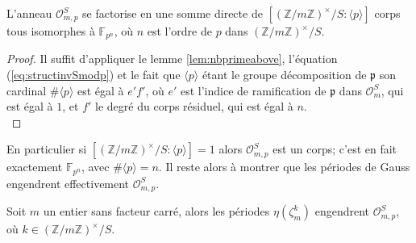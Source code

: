 \documentclass[a4paper]{article} %
\numberwithin{section}{part}
\numberwithin{equation}{section}
\newcommand\zmodninv[1]{(\mathbb{Z}/#1\mathbb{Z})^{\times}}
\newcommand\GF[1]{\mathbb{F}_{#1}}
\newcommand\EO{\mathcal{O}}
\newcommand\groupgen[1]{\langle{#1}\rangle}
\begin{document}
\begin{cor}
L'anneau $\EO_{m,p}^S$ se factorise en une somme directe de
$[\zmodninv{m}/S:\groupgen{p}]$ corps tous isomorphes à $\GF{p^n}$, où $n$ est 
l'ordre de $p$ dans $\zmodninv{m}/S$.
\end{cor}
\begin{proof}
Il suffit d'appliquer le lemme \ref{lem:nbprimeabove}, l'équation
(\ref{eq:structinvSmodp}) et le fait que $\groupgen{p}$ étant le groupe
décomposition de $\mathfrak{p}$ son cardinal $\#\groupgen{p}$ est égal à $e'f'$,
où $e'$ est l'indice de ramification de $\mathfrak{p}$ dans $\EO_m^S$, qui est 
égal à $1$, et $f'$ le degré du corps résiduel, qui est égal à $n$.\\
\end{proof}
En particulier si $[\zmodninv{m}/S:\groupgen{p}] = 1$ alors $\EO_{m,p}^S$ est
un corps; c'est en fait exactement $\GF{p^n}$, avec $\#\groupgen{p} = n$. Il 
reste alors à montrer que les périodes de Gauss engendrent effectivement 
$\EO_{m,p}^S$.
\begin{lem}
Soit $m$ un entier sans facteur carré, alors les périodes $\eta(\zeta_m^k)$
engendrent $\EO_{m,p}^S$, où $k\in\zmodninv{m}/S$.
\end{lem}
\end{document}
